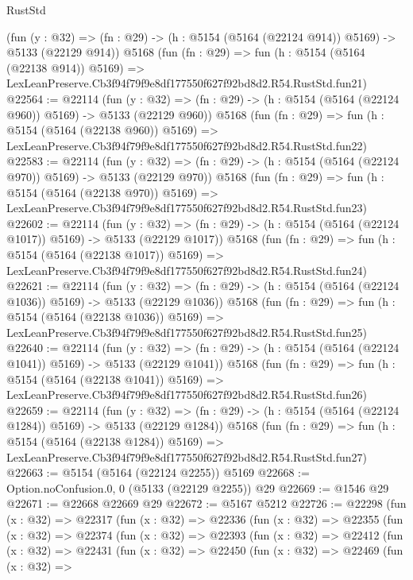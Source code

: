 \begin{lexlean}{RustStd}
\begin{coremodule}
    (fun (y : @32) => (fn : @29) -> (h : @5154 (@5164 (@22124 @914)) @5169) -> @5133 (@22129 @914))
    @5168
    (fun (fn : @29) =>
    fun (h : @5154 (@5164 (@22138 @914)) @5169) =>
    LexLeanPreserve.Cb3f94f79f9e8df177550f627f92bd8d2.R54.RustStd.fun21)
@22564 := @22114
    (fun (y : @32) => (fn : @29) -> (h : @5154 (@5164 (@22124 @960)) @5169) -> @5133 (@22129 @960))
    @5168
    (fun (fn : @29) =>
    fun (h : @5154 (@5164 (@22138 @960)) @5169) =>
    LexLeanPreserve.Cb3f94f79f9e8df177550f627f92bd8d2.R54.RustStd.fun22)
@22583 := @22114
    (fun (y : @32) => (fn : @29) -> (h : @5154 (@5164 (@22124 @970)) @5169) -> @5133 (@22129 @970))
    @5168
    (fun (fn : @29) =>
    fun (h : @5154 (@5164 (@22138 @970)) @5169) =>
    LexLeanPreserve.Cb3f94f79f9e8df177550f627f92bd8d2.R54.RustStd.fun23)
@22602 := @22114
    (fun (y : @32) =>
    (fn : @29) -> (h : @5154 (@5164 (@22124 @1017)) @5169) -> @5133 (@22129 @1017))
    @5168
    (fun (fn : @29) =>
    fun (h : @5154 (@5164 (@22138 @1017)) @5169) =>
    LexLeanPreserve.Cb3f94f79f9e8df177550f627f92bd8d2.R54.RustStd.fun24)
@22621 := @22114
    (fun (y : @32) =>
    (fn : @29) -> (h : @5154 (@5164 (@22124 @1036)) @5169) -> @5133 (@22129 @1036))
    @5168
    (fun (fn : @29) =>
    fun (h : @5154 (@5164 (@22138 @1036)) @5169) =>
    LexLeanPreserve.Cb3f94f79f9e8df177550f627f92bd8d2.R54.RustStd.fun25)
@22640 := @22114
    (fun (y : @32) =>
    (fn : @29) -> (h : @5154 (@5164 (@22124 @1041)) @5169) -> @5133 (@22129 @1041))
    @5168
    (fun (fn : @29) =>
    fun (h : @5154 (@5164 (@22138 @1041)) @5169) =>
    LexLeanPreserve.Cb3f94f79f9e8df177550f627f92bd8d2.R54.RustStd.fun26)
@22659 := @22114
    (fun (y : @32) =>
    (fn : @29) -> (h : @5154 (@5164 (@22124 @1284)) @5169) -> @5133 (@22129 @1284))
    @5168
    (fun (fn : @29) =>
    fun (h : @5154 (@5164 (@22138 @1284)) @5169) =>
    LexLeanPreserve.Cb3f94f79f9e8df177550f627f92bd8d2.R54.RustStd.fun27)
@22663 := @5154 (@5164 (@22124 @2255)) @5169
@22668 := Option.noConfusion.{0, 0} (@5133 (@22129 @2255)) @29
@22669 := @1546 @29
@22671 := @22668 @22669 @29
@22672 := @5167 @5212
@22726 := @22298
    (fun (x : @32) =>
    @22317
      (fun (x : @32) =>
      @22336
        (fun (x : @32) =>
        @22355
          (fun (x : @32) =>
          @22374
            (fun (x : @32) =>
            @22393
              (fun (x : @32) =>
              @22412
                (fun (x : @32) =>
                @22431
                  (fun (x : @32) =>
                  @22450
                    (fun (x : @32) =>
                    @22469
                      (fun (x : @32) =>

\end{coremodule}
\end{lexlean}
